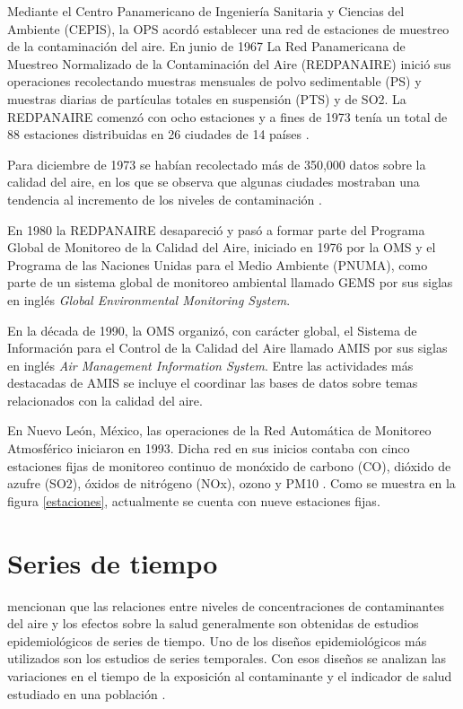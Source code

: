 Mediante el Centro Panamericano de Ingeniería Sanitaria y Ciencias del Ambiente (CEPIS), la OPS acordó establecer una red de estaciones de muestreo de la contaminación del aire.
En junio de 1967 La Red Panamericana de Muestreo Normalizado de la Contaminación del Aire (REDPANAIRE) inició sus operaciones recolectando muestras mensuales de polvo sedimentable (PS) y muestras diarias de partículas totales en suspensión (PTS) y de SO2. La REDPANAIRE comenzó con ocho estaciones y a fines de 1973 tenía un total de 88 estaciones distribuidas en 26 ciudades de 14 países \citep{r5}.

Para diciembre de 1973 se habían recolectado más de 350,000 datos sobre la calidad del aire, en los que se observa que algunas ciudades mostraban una tendencia al incremento de los niveles de contaminación \citep{r5}.

En 1980 la REDPANAIRE desapareció y pasó a formar parte del Programa Global de Monitoreo de la Calidad del Aire, iniciado en 1976 por la OMS y el Programa de las Naciones Unidas para el Medio Ambiente (PNUMA), como parte de un sistema global de monitoreo ambiental llamado GEMS por sus siglas en inglés \emph{Global Environmental Monitoring System}.

En la década de 1990, la OMS organizó, con carácter global, el Sistema de Información para el Control de la Calidad del Aire llamado AMIS por sus siglas en inglés \emph{Air Management Information System}. Entre las actividades más destacadas de AMIS se incluye el coordinar las bases de datos sobre temas relacionados con la calidad del aire.

En Nuevo León, México, las operaciones de la Red Automática de Monitoreo Atmosférico iniciaron en 1993. Dicha red en sus inicios contaba con cinco estaciones fijas de monitoreo continuo de monóxido de carbono (CO), dióxido de azufre (SO2), óxidos de nitrógeno (NOx), ozono y PM10 \citep{r4}. Como se muestra en la figura \ref{estaciones}, actualmente se cuenta con nueve estaciones fijas.

\section{Series de tiempo}
\citet{r4} mencionan que las relaciones entre niveles de concentraciones de contaminantes del aire y los efectos sobre la salud generalmente son obtenidas de estudios epidemiológicos de series de tiempo. Uno de los diseños epidemiológicos más utilizados son los estudios de series temporales. Con esos diseños se analizan las variaciones en el tiempo de la exposición al contaminante y el indicador de salud estudiado en una población \citep{r1}.

